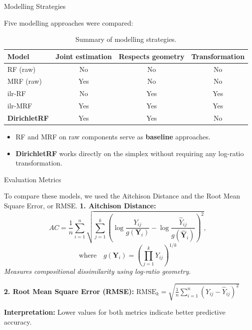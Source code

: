 \begin{frame}{Modelling Strategies}

Five modelling approaches were compared:

\begin{table}
\centering
\small
\begin{tabular}{lccc}
\toprule
Model & Joint estimation & Respects geometry & Transformation \\
\midrule
RF (raw)         & No  & No  & No  \\
MRF (raw)        & Yes & No  & No  \\
ilr-RF           & No  & Yes & Yes \\
ilr-MRF          & Yes & Yes & Yes \\
\textbf{DirichletRF}   & Yes & Yes & No  \\
\bottomrule
\end{tabular}
\caption{Summary of modelling strategies.}
\end{table}

\begin{itemize}
    \item RF and MRF on raw components serve as \textbf{baseline} approaches.
    \item \textbf{DirichletRF} works directly on the simplex without requiring any log-ratio transformation.
\end{itemize}

\end{frame}




\begin{frame}{Evaluation Metrics}

To compare these models, we used  the Aitchison Distance and the Root Mean Square Error, or RMSE.
\vspace{0.2cm}
\textbf{1. Aitchison Distance:}
\[
AC = \frac{1}{n} \sum_{i=1}^n \sqrt{\sum_{j=1}^k \left(\log\frac{Y_{ij}}{g(\mathbf{Y}_i)} - \log\frac{\hat{Y}_{ij}}{g(\hat{\mathbf{Y}}_i)}\right)^2},
\]
\[
\text{where} \quad g(\mathbf{Y}_i) = \left(\prod_{j=1}^k Y_{ij}\right)^{1/k}
\]
\textit{Measures compositional dissimilarity using log-ratio geometry.}

\vspace{0.3cm}
\textbf{2. Root Mean Square Error (RMSE):}
$
\text{RMSE}_k =  \sqrt{\frac{1}{n} \sum_{i=1}^n (Y_{ij} - \hat{Y}_{ij})^2}
$

\vspace{0.3cm}
\textbf{Interpretation:} Lower values for both metrics indicate better predictive accuracy.
\end{frame}



